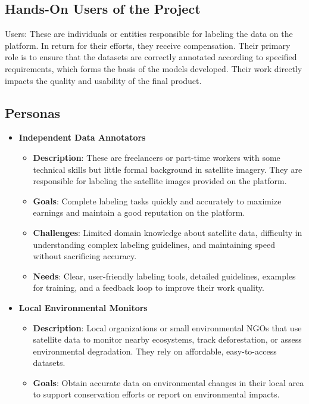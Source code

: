 \documentclass[12pt]{article}
\begin{document}
\subsection{Hands-On Users of the Project}
Users: These are individuals or entities responsible for labeling the data on the platform. In return for their efforts, they receive compensation. Their primary role is to ensure that the datasets are correctly annotated according to specified requirements, which forms the basis of the models developed. Their work directly impacts the quality and usability of the final product.

\newpage

\subsection{Personas}
\begin{itemize}
    \item \textbf{Independent Data Annotators}
    \begin{itemize}
        \item \textbf{Description}: These are freelancers or part-time workers with some technical skills but little formal background in satellite imagery. They are responsible for labeling the satellite images provided on the platform.
        \item \textbf{Goals}: Complete labeling tasks quickly and accurately to maximize earnings and maintain a good reputation on the platform.
        \item \textbf{Challenges}: Limited domain knowledge about satellite data, difficulty in understanding complex labeling guidelines, and maintaining speed without sacrificing accuracy.
        \item \textbf{Needs}: Clear, user-friendly labeling tools, detailed guidelines, examples for training, and a feedback loop to improve their work quality.
    \end{itemize}
    \item \textbf{Local Environmental Monitors}
    \begin{itemize}
        \item \textbf{Description}: Local organizations or small environmental NGOs that use satellite data to monitor nearby ecosystems, track deforestation, or assess environmental degradation. They rely on affordable, easy-to-access datasets.
        \item \textbf{Goals}: Obtain accurate data on environmental changes in their local area to support conservation efforts or report on environmental impacts.

\end{itemize}
\end{itemize}
\end{document}
